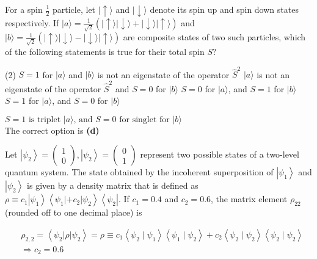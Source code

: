 \begin{enumerate}
\begin{minipage}{\textwidth}
	\item For a spin $\frac{1}{2}$ particle, let $|\uparrow\rangle$ and $|\downarrow\rangle$ denote its spin up and spin down states respectively. If $|a\rangle=\frac{1}{\sqrt{2}}(|\uparrow\rangle|\downarrow\rangle+|\downarrow\rangle|\uparrow\rangle)$ and $|b\rangle=\frac{1}{\sqrt{2}}(|\uparrow\rangle|\downarrow\rangle-|\downarrow\rangle|\uparrow\rangle)$ are composite states of two such particles, which of the following statements is true for their total spin $S ?$
\end{minipage}
\begin{tasks}(2)
	\task[\textbf{A.}] $S=1$ for $|a\rangle$ and $|b\rangle$ is not an eigenstate of the operator $\hat{S}^{2}$
	\task[\textbf{B.}]$|a\rangle$ is not an eigenstate of the operator $\hat{S}^{2}$ and $S=0$ for $|b\rangle$
	\task[\textbf{C.}]$S=0$ for $|a\rangle$, and $S=1$ for $|b\rangle$
	\task[\textbf{D.}]$S=1$ for $|a\rangle$, and $S=0$ for $|b\rangle$
\end{tasks}
\begin{answer}
	$S=1 \text { is triplet }|a\rangle \text {, and } S=0 \text { for singlet for }|b\rangle$\\
	The correct option is \textbf{(d)}
\end{answer}
\begin{minipage}{\textwidth}
	\item Let $\left|\psi_{2}\right\rangle=\left(\begin{array}{c}1 \\ 0\end{array}\right),\left|\psi_{2}\right\rangle=\left(\begin{array}{c}0 \\ 1\end{array}\right)$ represent two possible states of a two-level quantum system. The state obtained by the incoherent superposition of $\left|\psi_{1}\right\rangle$ and $\left|\psi_{2}\right\rangle$ is given by a density matrix that is defined as $\rho \equiv c_{1}\left|\psi_{1}\right\rangle\left\langle\psi_{1}\left|+c_{2}\right| \psi_{2}\right\rangle\left\langle\psi_{2}\right| .$ If $c_{1}=0.4$ and $c_{2}=0.6$, the matrix element $\rho_{22}$ (rounded off to one decimal place) is
\end{minipage}
\begin{answer}
	\begin{align*}
		& \rho_{2,2}=\left\langle\psi_{2}|\rho| \psi_{2}\right\rangle=\rho \equiv c_{1}\left\langle\psi_{2} \mid \psi_{1}\right\rangle\left\langle\psi_{1} \mid \psi_{2}\right\rangle+c_{2}\left\langle\psi_{2} \mid \psi_{2}\right\rangle\left\langle\psi_{2} \mid \psi_{2}\right\rangle \\
		&\Rightarrow c_{2}=0.6
	\end{align*}
\end{answer}
\end{enumerate}